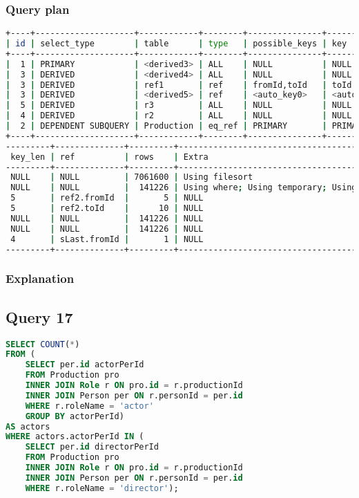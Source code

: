 \subsubsection{Query plan}
\begin{lstlisting}[language=bash]
+----+--------------------+------------+--------+---------------+-------------+
| id | select_type        | table      | type   | possible_keys | key         |
+----+--------------------+------------+--------+---------------+-------------+
|  1 | PRIMARY            | <derived3> | ALL    | NULL          | NULL        |
|  3 | DERIVED            | <derived4> | ALL    | NULL          | NULL        |
|  3 | DERIVED            | ref1       | ref    | fromId,toId   | toId        |
|  3 | DERIVED            | <derived5> | ref    | <auto_key0>   | <auto_key0> |
|  5 | DERIVED            | r3         | ALL    | NULL          | NULL        |
|  4 | DERIVED            | r2         | ALL    | NULL          | NULL        |
|  2 | DEPENDENT SUBQUERY | Production | eq_ref | PRIMARY       | PRIMARY     |
+----+--------------------+------------+--------+---------------+-------------+
---------+--------------+---------+----------------------------------------------+
 key_len | ref          | rows    | Extra                                        |
---------+--------------+---------+----------------------------------------------+
 NULL    | NULL         | 7061600 | Using filesort                               |
 NULL    | NULL         |  141226 | Using where; Using temporary; Using filesort |
 5       | ref2.fromId  |       5 | NULL                                         |
 5       | ref2.toId    |      10 | NULL                                         |
 NULL    | NULL         |  141226 | NULL                                         |
 NULL    | NULL         |  141226 | NULL                                         |
 4       | sLast.fromId |       1 | NULL                                         |
---------+--------------+---------+----------------------------------------------+
\end{lstlisting}

\subsubsection{Explanation}


\subsection{Query 17}
\begin{lstlisting}[language=sql]
SELECT COUNT(*)
FROM (
	SELECT per.id actorPerId
	FROM Production pro
	INNER JOIN Role r ON pro.id = r.productionId
	INNER JOIN Person per ON r.personId = per.id
	WHERE r.roleName = 'actor'
	GROUP BY actorPerId)
AS actors
WHERE actors.actorPerId IN (
	SELECT per.id directorPerId
	FROM Production pro
	INNER JOIN Role r ON pro.id = r.productionId
	INNER JOIN Person per ON r.personId = per.id
	WHERE r.roleName = 'director');
\end{lstlisting}

